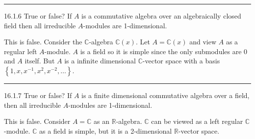 \documentclass[a4paper, 12pt]{article}
\begin{document}
\noindent\rule{7in}{2.8pt}
\begin{problem}{16.1.6}
True or false? If \(A\) is a commutative algebra over an algebraically closed field then all irreducible \(A\)-modules are 1-dimensional.
\end{problem}
\begin{solution}
This is false. Consider the \(\mathbb{C}\)-algebra \(\mathbb{C}(x)\). Let \(A=\mathbb{C}(x)\) and view \(A\) as a regular left \(A\)-module. \(A\) is a field so it is simple since 
the only submodules are \(0\) and \(A\) itself. But \(A\) is a infinite dimensional \(\mathbb{C}\)-vector space with a basis \(\left\{ 1,x,x^{-1},x^2,x^{-2},\ldots \right\}\).
\end{solution}

\noindent\rule{7in}{2.8pt}
\begin{problem}{16.1.7}
True or false? If \(A\) is a finite dimensional commutative algebra over a field, then all irreducible \(A\)-modules are 1-dimensional.
\end{problem}
\begin{solution}
This is false. Consider \(A=\mathbb{C}\) as an \(\mathbb{R}\)-algebra. \(\mathbb{C}\) can be viewed as a left regular \(\mathbb{C}\)-module. \(\mathbb{C}\) as a field is simple, but it is a 
2-dimensional \(\mathbb{R}\)-vector space.
\end{solution}
\end{document}
